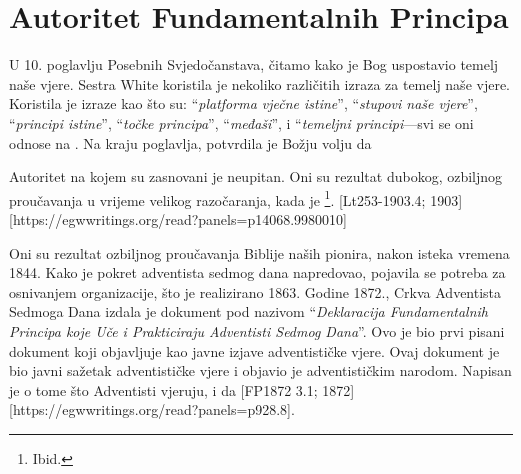\chapter{Autoritet Fundamentalnih Principa} \label{chap:authority}

U 10. poglavlju Posebnih Svjedočanstava, čitamo kako je Bog uspostavio temelj naše vjere. Sestra White koristila je nekoliko različitih izraza za temelj naše vjere. Koristila je izraze kao što su: “\textit{platforma vječne istine}”, “\textit{stupovi naše vjere}”, “\textit{principi istine}”, “\textit{točke principa}”, “\textit{međaši}”, i “\textit{temeljni principi}—svi se oni odnose na . Na kraju poglavlja, potvrdila je Božju volju da 

Autoritet na kojem su  zasnovani je neupitan. Oni su rezultat dubokog, ozbiljnog proučavanja u vrijeme velikog razočaranja, kada je \footnote{Ibid.}. [Lt253-1903.4; 1903][https://egwwritings.org/read?panels=p14068.9980010]

Oni su rezultat ozbiljnog proučavanja Biblije naših pionira, nakon isteka vremena 1844. Kako je pokret adventista sedmog dana napredovao, pojavila se potreba za osnivanjem organizacije, što je realizirano 1863. Godine 1872., Crkva Adventista Sedmoga Dana izdala je dokument pod nazivom “\textit{Deklaracija Fundamentalnih Principa koje Uče i Prakticiraju Adventisti Sedmog Dana}”. Ovo je bio prvi pisani dokument koji objavljuje  kao javne izjave adventističke vjere. Ovaj dokument je bio javni sažetak adventističke vjere i objavio je  adventističkim narodom. Napisan je  o tome što Adventisti vjeruju,  i da [FP1872 3.1; 1872][https://egwwritings.org/read?panels=p928.8].

